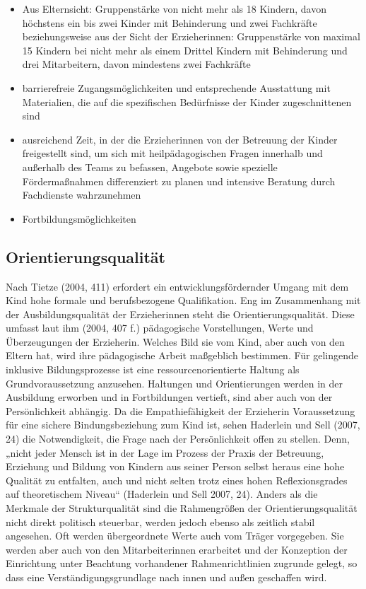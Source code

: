 \begin{itemize}
\item Aus Elternsicht: Gruppenstärke von nicht mehr als 18 Kindern, davon höchstens ein bis zwei Kinder mit Behinderung und zwei Fachkräfte 
beziehungsweise 
aus der Sicht der Erzieherinnen: Gruppenstärke von maximal 15 Kindern bei nicht mehr als einem Drittel Kindern mit Behinderung und drei Mitarbeitern, davon mindestens zwei Fachkräfte
\item barrierefreie Zugangsmöglichkeiten und entsprechende Ausstattung mit Materialien, die auf die spezifischen Bedürfnisse der Kinder zugeschnittenen sind
\item ausreichend Zeit, in der die Erzieherinnen von der Betreuung der Kinder freigestellt sind, um sich mit heilpädagogischen Fragen innerhalb und außerhalb des Teams zu befassen, Angebote sowie spezielle Fördermaßnahmen differenziert zu planen und intensive Beratung durch Fachdienste wahrzunehmen
\item Fortbildungsmöglichkeiten
\end{itemize}

\subsection{Orientierungsqualität}
Nach Tietze (2004, 411) erfordert ein entwicklungsfördernder Umgang mit dem Kind hohe formale und berufsbezogene Qualifikation. Eng im Zusammenhang mit der Ausbildungsqualität der Erzieherinnen steht die Orientierungsqualität. Diese umfasst laut ihm (2004, 407 f.) pädagogische Vorstellungen, Werte und Überzeugungen der Erzieherin. Welches Bild sie vom Kind, aber auch von den Eltern hat, wird ihre pädagogische Arbeit maßgeblich bestimmen. Für gelingende inklusive Bildungsprozesse ist eine ressourcenorientierte Haltung als Grundvoraussetzung anzusehen. Haltungen und Orientierungen werden in der Ausbildung erworben und in Fortbildungen vertieft, sind aber auch von der Persönlichkeit abhängig. 
Da die Empathiefähigkeit der Erzieherin Voraussetzung für eine sichere Bindungsbeziehung zum Kind ist, sehen Haderlein und Sell (2007, 24) die Notwendigkeit, die Frage nach der Persönlichkeit offen zu stellen. Denn, „nicht jeder Mensch ist in der Lage im Prozess der Praxis der Betreuung, Erziehung und Bildung von Kindern aus seiner Person selbst heraus eine hohe Qualität zu entfalten, auch und nicht selten trotz eines hohen Reflexionsgrades auf theoretischem Niveau“ (Haderlein und Sell 2007, 24). Anders als die Merkmale der Strukturqualität sind die Rahmengrößen der Orientierungsqualität nicht direkt politisch steuerbar, werden jedoch ebenso als zeitlich stabil angesehen. Oft werden übergeordnete Werte auch vom Träger vorgegeben. Sie werden aber auch von den Mitarbeiterinnen erarbeitet und der Konzeption der Einrichtung unter Beachtung vorhandener Rahmenrichtlinien zugrunde gelegt, so dass eine Verständigungsgrundlage nach innen und außen geschaffen wird. 


